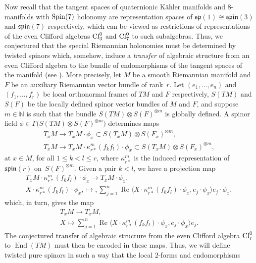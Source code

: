 \documentclass[pdftex]{sigma}
\newcommand{\lra}{\longrightarrow}
\numberwithin{equation}{section}
\begin{document}
Now recall that the tangent spaces of quaternionic K\"ahler manifolds and 8-manifolds with ${\rm Spin}(7)$ holonomy
are representation spaces of $\mathfrak{sp}(1)\cong \mathfrak{spin}(3)$ and $\mathfrak{spin}(7)$ respectively,
which can be viewed as restrictions of representations of the even Clifford algebras ${\rm Cl}_3^0$ and ${\rm Cl}_7^0$ to such subalgebras.
Thus, we conjectured that the special Riemannian holonomies must be determined by twisted spinors which,
somehow, induce a {\em transfer} of algebraic
structure from an even Clifford algebra to the bundle of endomorphisms of the tangent spaces of the manifold (see \cite{Santana}).
More precisely,
let $M$ be a smooth Riemannian manifold and $F$ be an auxiliary Riemannian vector bundle of rank~$r$.
Let $(e_1,\dots ,e_n)$ and $(f_1,\dots ,f_r)$ be local orthonormal frames of $TM$ and $F$ respectively,
$S(TM)$ and $S(F)$ be the locally defined
spinor vector bundles of $M$ and $F$, and suppose $m\in\mathbb{N}$ is such that the bundle
$S(TM)\otimes S(F)^{\otimes m}$ is globally defined.
A spinor field $\phi\in\Gamma\big(S(TM)\otimes S(F)^{\otimes m}\big)$ determines maps
\begin{gather*}
 T_xM \lra T_xM\cdot\phi_x \subset S(T_xM)\otimes S(F_x)^{\otimes m} ,\\
 T_xM \lra T_xM\cdot \kappa_{r*}^m(f_kf_l)\cdot \phi_x \subset S(T_xM)\otimes S(F_x)^{\otimes m} ,
\end{gather*}
at $x\in M$, for all $1\leq k<l\leq r$, where $\kappa_{r*}^m$ is the induced representation of~$\mathfrak{spin}(r)$ on~$S(F)^{\otimes m}$.
Given a pair $k<l$, we have a projection map
\begin{gather*}
 T_xM\cdot \kappa_{r*}^m(f_kf_l)\cdot \phi_x \lra T_xM\cdot \phi_x,\\
 X\cdot \kappa_{r*}^m(f_kf_l)\cdot \phi_x ,\longmapsto, \sum_{j=1}^n
\operatorname{Re}\big\langle X\cdot \kappa_{r*}^m(f_kf_l)\cdot \phi_x,e_j\cdot \phi_x\big\rangle e_j\cdot\phi_x,
\end{gather*}
which, in turn, gives the map
\begin{gather*}
 T_xM \lra T_xM,\\
 X \longmapsto \sum_{j=1}^n \operatorname{Re}\big\langle X\cdot \kappa_{r*}^m(f_kf_l)\cdot \phi_x,e_j\cdot \phi_x\big\rangle e_j.
\end{gather*}
The conjectured transfer of algebraic structure from the even Clifford algebra ${\rm Cl}_r^0$ to $\operatorname{End}(TM)$ must then be encoded in these maps.
Thus, we will define twisted pure spinors in such a way that the local $2$-forms and endomorphisms
\end{document}
